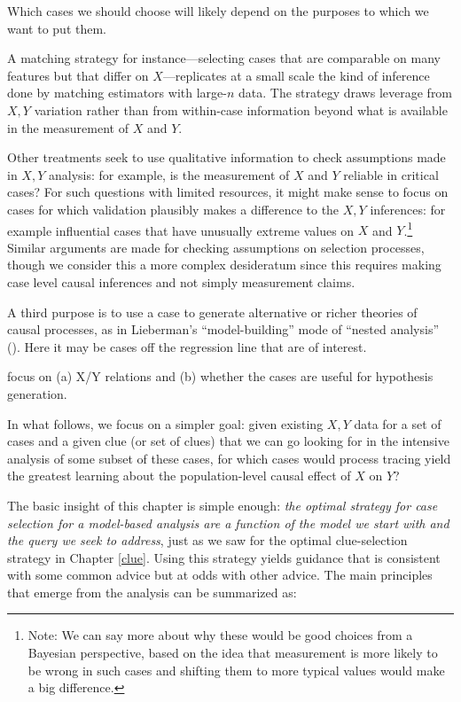 \documentclass[
  12pt,
]{book}
\begin{document}
Which cases we should choose will likely depend on the purposes to which we want to put them.

A matching strategy for instance---selecting cases that are comparable on many features but that differ on \(X\)---replicates at a small scale the kind of inference done by matching estimators with large-\(n\) data. The strategy draws leverage from \(X,Y\) variation rather than from within-case information beyond what is available in the measurement of \(X\) and \(Y\).

Other treatments seek to use qualitative information to check assumptions made in \(X, Y\) analysis: for example, is the measurement of \(X\) and \(Y\) reliable in critical cases?
For such questions with limited resources, it might make sense to focus on cases for which validation plausibly makes a difference to the \(X,Y\) inferences: for example influential cases that have unusually extreme values on \(X\) and \(Y\).\footnote{Note: We can say more about why these would be good choices from a Bayesian perspective, based on the idea that measurement is more likely to be wrong in such cases and shifting them to more typical values would make a big difference.} Similar arguments are made for checking assumptions on selection processes, though we consider this a more complex desideratum since this requires making case level causal inferences and not simply measurement claims.

A third purpose is to use a case to generate alternative or richer theories of causal processes, as in Lieberman's ``model-building'' mode of ``nested analysis'' (\citet{Lieberman2005nested}). Here it may be cases off the regression line that are of interest.

\citet{weller2014finding} focus on (a) X/Y relations and (b) whether the cases are useful for hypothesis generation.

In what follows, we focus on a simpler goal: given existing \(X, Y\) data for a set of cases and a given clue (or set of clues) that we can go looking for in the intensive analysis of some subset of these cases, for which cases would process tracing yield the greatest learning about the population-level causal effect of \(X\) on \(Y\)?

The basic insight of this chapter is simple enough: \emph{the optimal strategy for case selection for a model-based analysis are a function of the model we start with and the query we seek to address}, just as we saw for the optimal clue-selection strategy in Chapter \ref{clue}. Using this strategy yields guidance that is consistent with some common advice but at odds with other advice. The main principles that emerge from the analysis can be summarized as:
\end{document}
